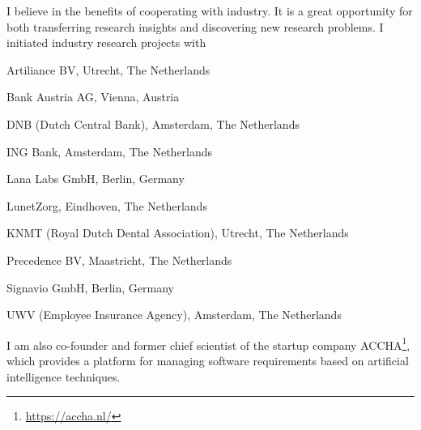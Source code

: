 \justify
I believe in the benefits of cooperating with industry. It is a great opportunity for both transferring research insights and discovering new research problems. I initiated industry research projects with 
\begin{itemize*}
\item Artiliance BV, Utrecht, The Netherlands
\item Bank Austria AG, Vienna, Austria 
\item DNB (Dutch Central Bank), Amsterdam, The Netherlands 
\item ING Bank, Amsterdam, The Netherlands
\item Lana Labs GmbH, Berlin, Germany
\item LunetZorg, Eindhoven, The Netherlands
\item KNMT (Royal Dutch Dental Association), Utrecht, The Netherlands
\item Precedence BV, Maastricht, The Netherlands
\item Signavio GmbH, Berlin, Germany
\item UWV (Employee Insurance Agency), Amsterdam, The Netherlands
\end{itemize*}


\noindent I am also co-founder and former chief scientist of the startup company ACCHA\footnote{\href{https://accha.nl/}{https://accha.nl/}}, which provides a platform for managing software requirements based on artificial intelligence techniques. 